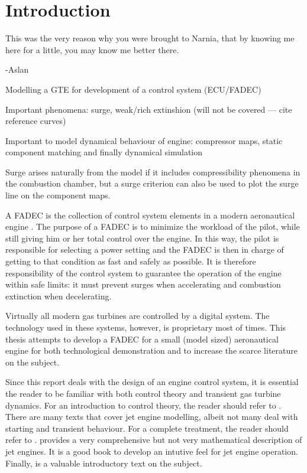 \documentclass[tcc]{subfiles}
\begin{document}
\chapter{Introduction}
\label{ch:intro}
\epigraph{This was the very reason why you were brought to Narnia, that by knowing me here for a little, you may know me better there.}{-Aslan}

Modelling a GTE for development of a control system (ECU/FADEC)

Important phenomena: surge, weak/rich extinshion (will not be covered --- cite reference curves)

Important to model dynamical behaviour of engine: compressor maps, static component matching and finally dynamical simulation

Surge arises naturally from the model if it includes compressibility phenomena in the combustion chamber, but a surge criterion can also be used to plot the surge line on the component maps.

A \gls{FADEC} is the collection of control system elements in 
 a modern aeronautical engine \cite{rolls-royce}.
The purpose of a \gls{FADEC} is to minimize the workload of the pilot,
 while still giving him or her total control over the engine.
In this way, the pilot is responsible for selecting a power setting 
 and the \gls{FADEC} is then in charge of getting to that condition
 as fast and safely as possible. It is therefore responsibility of the
 control system to guarantee the operation of the engine within safe limits:
 it must prevent surges when accelerating 
 and combustion extinction when decelerating.

Virtually all modern gas turbines are controlled by a digital system.
The technology used in these systems, however, is proprietary most of times.
This thesis attempts to develop a \gls{FADEC} 
for a small (model sized) aeronautical engine for both technological demonstration 
and to increase the scarce literature on the subject.

Since this report deals with the design of an engine control system,
 it is essential the reader to be familiar with both control theory and transient gas turbine dynamics.
For an introduction to control theory, the reader should refer to 
 \textcite{dorf2011modern,franklinfeedback}.
There are many texts that cover jet engine modelling, 
 albeit not many deal with starting and transient behaviour. 
For a complete treatment, the reader should refer to \textcite{walsh2004gas}. 
\textcite{rolls-royce} provides a very comprehensive 
 but not very mathematical description of jet engines. 
 It is a good book to develop an intutive feel for jet engine operation. 
Finally, \textcite{Cumpsty2015} is a valuable introductory text on the subject.
\end{document}
